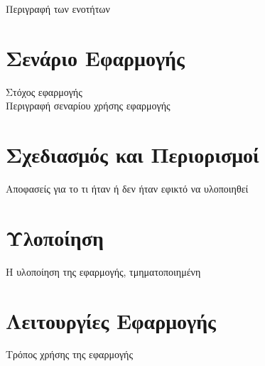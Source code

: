 
Περιγραφή των ενοτήτων

\section{Σενάριο Εφαρμογής}
Στόχος εφαρμογής\\
Περιγραφή σεναρίου χρήσης εφαρμογής

\section{Σχεδιασμός και Περιορισμοί}
Αποφασείς για το τι ήταν ή δεν ήταν εφικτό να υλοποιηθεί

\section{Υλοποίηση}
Η υλοποίηση της εφαρμογής, τμηματοποιημένη

\section{Λειτουργίες Εφαρμογής}
Τρόπος χρήσης της εφαρμογής

